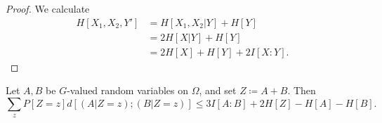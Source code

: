\begin{proof}  We calculate
  \begin{equation}
  \begin{split} H[X_1, X_2, Y'] &= H[X_1,X_2|Y] + H[Y] \\
    &= 2 H[X|Y] + H[Y] \\
    &= 2 H[X] + H[Y] + 2 I[X:Y].
  \end{split}  \end{equation}
\end{proof}


\begin{lemma}\label{lem-bsg}
  Let $A,B$ be $G$-valued random variables on $\Omega$, and set $Z \coloneq A+B$.
Then
\begin{equation}\label{2-bsg-takeaway} \sum_{z} P[Z=z] d[(A | Z = z); (B | Z = z)] \leq 3 I[A:B] + 2 H[Z] - H[A] - H[B]. \end{equation}
\end{lemma}

